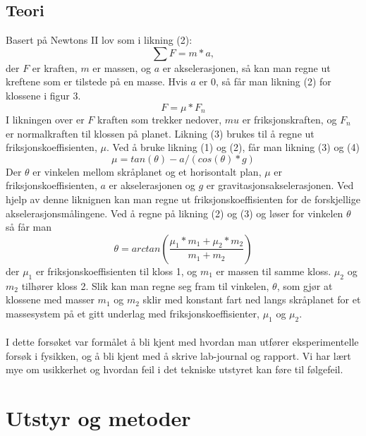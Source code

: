 \documentclass[10pt,a4paper]{report}
\begin{document}
\section*{Teori}
Basert på Newtons II lov som i likning (2): 
\begin{equation}
\sum{F} = m*a,
\end{equation} der $F$ er kraften, $m$ er massen, og $a$ er akselerasjonen, så kan man regne ut kreftene som er tilstede på en masse. Hvis $a$ er 0, så får man likning (2) for klossene i figur 3. 
\begin{equation}
F = \mu *F_n
\end{equation}
I likningen over er $F$ kraften som trekker nedover, $mu$ er friksjonskraften, og $F_n$ er normalkraften til klossen på planet.
Likning (3) brukes til å regne ut friksjonskoeffisienten, $\mu$. Ved å bruke likning (1) og (2), får man likning (3) og (4)
\begin{equation}
\mu = tan(\theta)-a/(cos(\theta)*g)
\end{equation}
Der $\theta$ er vinkelen mellom skråplanet og et horisontalt plan, $\mu$ er friksjonskoeffisienten, $a$ er akselerasjonen og $g$ er gravitasjonsakselerasjonen. Ved hjelp av denne liknignen kan man regne ut friksjonskoeffisienten for de forskjellige akselerasjonsmålingene. Ved å regne på likning (2) og (3) og løser for vinkelen $\theta$ så får man
\begin{equation}
\theta = arctan(\frac{\mu_1*m_1+\mu_2*m_2}{m_1+m_2})
\end{equation}
der $\mu_1$ er friksjonskoeffisienten til kloss 1, og $m_1$ er massen til samme kloss. $\mu_2$ og $m_2$ tilhører kloss 2. Slik kan man regne seg fram til vinkelen, $\theta$, som gjør at klossene med masser $m_1$ og $m_2$ sklir med konstant fart ned langs skråplanet for et massesystem på et gitt underlag med friksjonskoeffisienter, $\mu_1$ og $\mu_2$.\\
\\I dette forsøket var formålet å bli kjent med hvordan man utfører eksperimentelle forsøk i fysikken, og å bli kjent med å skrive lab-journal og rapport. Vi har lært mye om usikkerhet og hvordan feil i det tekniske utstyret kan føre til følgefeil.

\chapter*{Utstyr og metoder}
\end{document}
